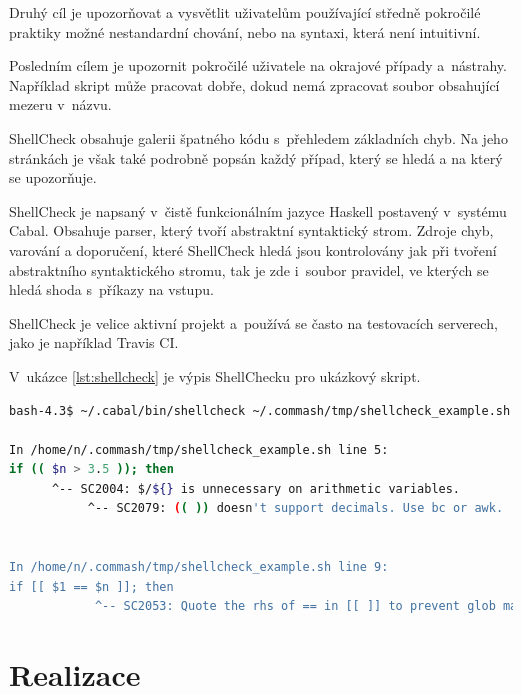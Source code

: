 \documentclass[thesis=M,czech]{FITthesis}[2012/06/26]
\begin{document}
Druhý cíl je upozorňovat a vysvětlit uživatelům používající středně pokročilé praktiky možné nestandardní chování, nebo na syntaxi, která není intuitivní.

Posledním cílem je upozornit pokročilé uživatele na okrajové případy a~nástrahy. Například skript může pracovat dobře, dokud nemá zpracovat soubor obsahující mezeru v~názvu.

ShellCheck obsahuje galerii špatného kódu s~přehledem základních chyb. Na jeho stránkách je však také podrobně popsán každý případ, který se hledá a na který se upozorňuje.

ShellCheck je napsaný v~čistě funkcionálním jazyce Haskell \cite{haskell} postavený v~systému Cabal. Obsahuje parser, který tvoří abstraktní syntaktický strom. Zdroje chyb, varování a doporučení, které ShellCheck hledá jsou kontrolovány jak při tvoření abstraktního syntaktického stromu, tak je zde i~soubor pravidel, ve kterých se hledá shoda s~příkazy na vstupu.

ShellCheck je velice aktivní projekt a~používá se často na testovacích serverech, jako je například Travis CI.

V~ukázce \ref{lst:shellcheck} je výpis ShellChecku pro ukázkový skript.

\begin{minipage}{\linewidth}
\begin{lstlisting}[language=bash, caption={ShellCheck}, label={lst:shellcheck}]
bash-4.3$ ~/.cabal/bin/shellcheck ~/.commash/tmp/shellcheck_example.sh

In /home/n/.commash/tmp/shellcheck_example.sh line 5:
if (( $n > 3.5 )); then
      ^-- SC2004: $/${} is unnecessary on arithmetic variables.
           ^-- SC2079: (( )) doesn't support decimals. Use bc or awk.


In /home/n/.commash/tmp/shellcheck_example.sh line 9:
if [[ $1 == $n ]]; then
            ^-- SC2053: Quote the rhs of == in [[ ]] to prevent glob matching.
\end{lstlisting}
\end{minipage}



\chapter{Realizace}
\end{document}
